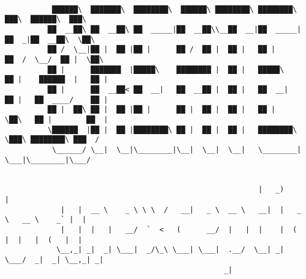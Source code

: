 \documentclass[varwidth=\maxdimen,margin=0.5cm,multi={verbatim}]{standalone}
\begin{document}
\begin{verbatim}

           ██████\  ███████\  ████████\  ██████\ ████████\ ████████\      ███\  ██████\  ███\
          ██  __██\ ██  __██\ ██  _____|██  __██\\__██  __|██  _____|    ██  _|██  __██\  \██\
          ██ /  \__|██ |  ██ |██ |      ██ /  ██ |  ██ |   ██ |         ██  /  \__/  ██ |  \██\
          ██ |      ███████  |█████\    ████████ |  ██ |   █████\       ██ |    ██████  |   ██ |
          ██ |      ██  __██< ██  __|   ██  __██ |  ██ |   ██  __|      ██ |   ██  ____/    ██ |
          ██ |  ██\ ██ |  ██ |██ |      ██ |  ██ |  ██ |   ██ |         \██\   ██ |        ██  |
          \██████  |██ |  ██ |████████\ ██ |  ██ |  ██ |   ████████\     \███\ ████████\ ███  /
           \______/ \__|  \__|\________|\__|  \__|  \__|   \________|      \___|\________|\___/

      
                                                           |   _)                       |
             |   |  __ \    _ \ \ \  /   __|   _ \  __ \   __|  |   _ \   __ \    _` |  |
             |   |  |   |   __/  `  <   (      __/  |   |  |    |  (   |  |   |  (   |  |
            \__,_| _|  _| \___|  _/\_\ \___| \___|  .__/  \__| _| \___/  _|  _| \__,_| _|
                                                   _|



\end{verbatim}
\end{document}
